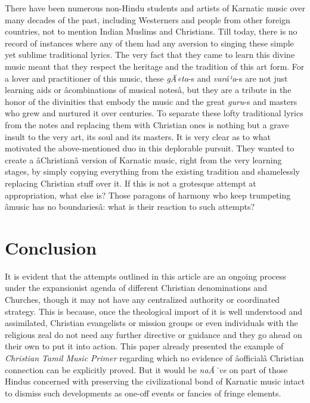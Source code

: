 There have been numerous non-Hindu students and artists of Karnatic music over many decades of the past, including Westerners and people from other foreign countries, not to mention Indian Muslims and Christians. Till today, there is no record of instances where any of them had any aversion to singing these simple yet sublime traditional lyrics. The very fact that they came to learn this divine music meant that they respect the heritage and the tradition of this art form. For a lover and practitioner of this music, these \textit{gÄ«ta}-s and \textit{vará¹a}-s are not just learning aids or âcombinations of musical notesâ, but they are a tribute in the honor of the divinities that embody the music and the great \textit{guru}-s and masters who grew and nurtured it over centuries. To separate these lofty traditional lyrics from the notes and replacing them with Christian ones is nothing but a grave insult to the very art, its soul and its masters. It is very clear as to what motivated the above-mentioned duo in this deplorable pursuit. They wanted to create a âChristianâ version of Karnatic music, right from the very learning stages, by simply copying everything from the existing tradition and shamelessly replacing Christian stuff over it. If this is not a grotesque attempt at appropriation, what else is? Those paragons of harmony who keep trumpeting âmusic has no boundariesâ: what is their reaction to such attempts?


\section*{Conclusion}

It is evident that the attempts outlined in this article are an ongoing process under the expansionist agenda of different Christian denominations and Churches, though it may not have any centralized authority or coordinated strategy. This is because, once the theological import of it is well understood and assimilated, Christian evangelists or mission groups or even individuals with the religious zeal do not need any further directive or guidance and they go ahead on their own to put it into action. This paper already presented the example of \textit{Christian Tamil Music Primer} regarding which no evidence of âofficialâ Christian connection can be explicitly proved. But it would be \textit{naÃ¯ve} on part of those Hindus concerned with preserving the civilizational bond of Karnatic music intact to dismiss such developments as one-off events or fancies of fringe elements.

